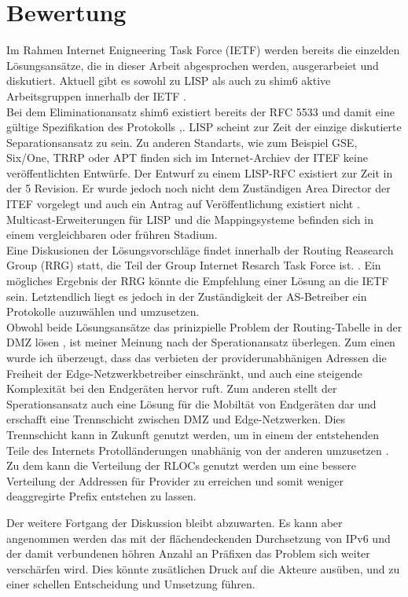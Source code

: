 \section{Bewertung}
Im Rahmen Internet Enigneering Task Force (IETF) werden bereits die einzelden Lösungsansätze, die in dieser Arbeit abgesprochen werden, ausgerarbeiet und diskutiert. Aktuell gibt es sowohl zu LISP als auch zu shim6 aktive Arbeitsgruppen innerhalb der IETF \cite{ietf:groups}. \\

Bei dem Eliminationansatz shim6 existiert bereits der RFC 5533 und damit eine gültige Spezifikation des Protokolls \cite{nordmark:2009:RFC5533},\cite{ietf:documents}. LISP scheint zur Zeit der einzige diskutierte Separationsansatz zu sein. Zu anderen Standarts, wie zum Beispiel GSE, Six/One, TRRP oder APT finden sich im Internet-Archiev der ITEF keine veröffentlichten Entwürfe. Der Entwurf zu einem LISP-RFC \cite{farinacci:2009:LISP} existiert zur Zeit in der 5 Revision. Er wurde jedoch noch nicht dem Zuständigen Area Director der ITEF vorgelegt und auch ein Antrag auf Veröffentlichung existiert nicht \cite{ietf:documents}.  Multicast-Erweiterungen für LISP und die Mappingsysteme befinden sich in einem vergleichbaren oder frühren Stadium. \\

Eine Diskusionen der Lösungsvorschläge findet innerhalb der Routing Reasearch Group (RRG) statt, die Teil der Group Internet Resarch Task Force ist. \cite{irtf:rrg}. Ein mögliches Ergebnis der RRG könnte die Empfehlung einer Lösung an die IETF sein. Letztendlich liegt es jedoch in der Zuständigkeit der AS-Betreiber ein Protokolle auzuwählen und umzusetzen. \\


Obwohl beide Lösungsansätze das prinizpielle Problem der Routing-Tabelle in der DMZ lösen \cite{jen:2008:start}, ist meiner Meinung nach der Sperationansatz überlegen. Zum einen wurde ich überzeugt, dass das verbieten der providerunabhänigen Adressen die Freiheit der Edge-Netzwerkbetreiber einschränkt, und auch eine steigende Komplexität bei den Endgeräten hervor ruft. Zum anderen stellt der Sperationsansatz auch eine Lösung für die Mobiltät von Endgeräten dar und erschafft eine Trennschicht zwischen DMZ und Edge-Netzwerken. Dies Trennschicht kann in Zukunft genutzt werden, um in einem der entstehenden Teile des Internets Protolländerungen unabhänig von der anderen umzusetzen \cite{jen:2008:start}. Zu dem kann die Verteilung der RLOCs genutzt werden um eine bessere Verteilung der Addressen für Provider zu erreichen und somit weniger deaggregirte Prefix entstehen zu lassen.

Der weitere Fortgang der Diskussion bleibt abzuwarten. Es kann aber angenommen werden das mit der flächendeckenden Durchsetzung von IPv6 und der damit verbundenen höhren Anzahl an Präfixen das Problem sich weiter verschärfen wird. Dies könnte zusätlichen Druck auf die Akteure ausüben, und zu einer schellen Entscheidung und Umsetzung führen.



